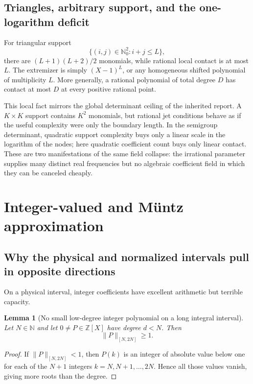 \documentclass[11pt,oneside]{article}
\newtheorem{lemma}[theorem]{Lemma}
\theoremstyle{definition}
\theoremstyle{remark}
\newcommand{\N}{\mathbb N}
\newcommand{\Nzero}{\mathbb N_0}
\newcommand{\Z}{\mathbb Z}
\begin{document}
\subsection{Triangles, arbitrary support, and the one-logarithm deficit}

For triangular support
\[
 \{(i,j)\in\Nzero^2:i+j\le L\},
\]
there are \((L+1)(L+2)/2\) monomials, while rational local contact is at most \(L\).  The
extremizer is simply \((X-1)^L\), or any homogeneous shifted polynomial of multiplicity
\(L\).  More generally, a rational polynomial of total degree \(D\) has contact at most
\(D\) at every positive rational point.

This local fact mirrors the global determinant ceiling of the inherited report.  A
\(K\times K\) support contains \(K^2\) monomials, but rational jet conditions behave as if the
useful complexity were only the boundary length.  In the semigroup determinant, quadratic
support complexity buys only a linear scale in the logarithm of the nodes; here quadratic
coefficient count buys only linear contact.  These are two manifestations of the same field
collapse: the irrational parameter supplies many distinct real frequencies but no algebraic
coefficient field in which they can be canceled cheaply.

\section{Integer-valued and M\"untz approximation}
\label{pa:sec-muntz}

\subsection{Why the physical and normalized intervals pull in opposite directions}

On a physical interval, integer coefficients have excellent arithmetic but terrible
capacity.

\begin{lemma}[No small low-degree integer polynomial on a long integral interval]
\label{pa:lem-small-integer-poly}
Let \(N\in\N\) and let \(0\ne P\in\Z[X]\) have degree \(d<N\).  Then
\begin{equation}
 \|P\|_{[N,2N]}\ge1.
 \label{pa:eq-integer-poly-floor}
\end{equation}
\end{lemma}

\begin{proof}
If \(\|P\|_{[N,2N]}<1\), then \(P(k)\) is an integer of absolute value below one for each of
the \(N+1\) integers \(k=N,N+1,\ldots,2N\).  Hence all those values vanish, giving more roots
than the degree.
\end{proof}
\end{document}
